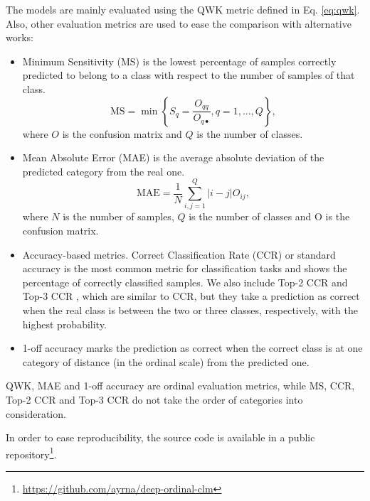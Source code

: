 \documentclass[journal]{IEEEtran}
\begin{document}
	The models are mainly evaluated using the QWK metric defined in Eq. \eqref{eq:qwk}. Also, other evaluation metrics are used to ease the comparison with alternative works:
	\begin{itemize}
		\item Minimum Sensitivity (MS) \cite{cruz2014metrics} is the lowest percentage of samples correctly predicted to belong to a class with respect to the number of samples of that class.
		\begin{equation}
			\nonumber
			\text{MS} = \min\left\lbrace S_q = \frac{O_{qq}}{O_{q\bullet}}, q = 1, ..., Q \right\rbrace,
		\end{equation}
		where $O$ is the confusion matrix and $Q$ is the number of classes.
		
		\item Mean Absolute Error (MAE) \cite{cruz2014metrics} is the average absolute deviation of the predicted category from the real one.
		\begin{equation}
			\nonumber
			\text{MAE} = \frac{1}{N} \sum^Q_{i,j = 1} |i-j|O_{ij},
		\end{equation}
		where $N$ is the number of samples, $Q$ is the number of classes and O is the confusion matrix.
		
		\item Accuracy-based metrics. Correct Classification Rate (CCR) or standard accuracy is the most common metric for classification tasks and shows the percentage of correctly classified samples. We also include Top-2 CCR and Top-3 CCR \cite{beckham2017unimodal}, which are similar to CCR, but they take a prediction as correct when the real class is between the two or three classes, respectively, with the highest probability.
		
		\item 1-off accuracy \cite{eidinger2014age,chen2016cascaded,levi2015age} marks the prediction as correct when the correct class is at one category of distance (in the ordinal scale) from the predicted one.
	\end{itemize}
	QWK, MAE and 1-off accuracy are ordinal evaluation metrics, while MS, CCR, Top-2 CCR and Top-3 CCR do not take the order of categories into consideration.
	
	In order to ease reproducibility, the source code is available in a public repository\footnote{\url{https://github.com/ayrna/deep-ordinal-clm}}.
\end{document}
